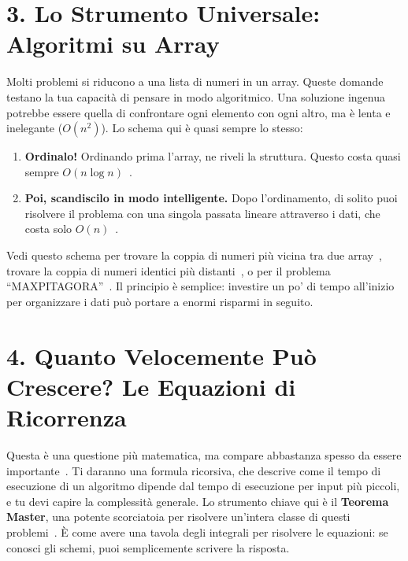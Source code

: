 \documentclass[a4paper, 11pt]{article}
\begin{document}
\section*{3. Lo Strumento Universale: Algoritmi su Array}

Molti problemi si riducono a una lista di numeri in un array. Queste domande testano la tua capacità di pensare in modo algoritmico. Una soluzione ingenua potrebbe essere quella di confrontare ogni elemento con ogni altro, ma è lenta e inelegante ($O(n^2)$). Lo schema qui è quasi sempre lo stesso:
\begin{enumerate}
    \item \textbf{Ordinalo!} Ordinando prima l'array, ne riveli la struttura. Questo costa quasi sempre $O(n \log n)$~\cite{esame_07_09_23_sort, esame_04_09_24_sort}.
    
    \item \textbf{Poi, scandiscilo in modo intelligente.} Dopo l'ordinamento, di solito puoi risolvere il problema con una singola passata lineare attraverso i dati, che costa solo $O(n)$~\cite{esame_04_09_24_scan}.
\end{enumerate}
Vedi questo schema per trovare la coppia di numeri più vicina tra due array~\cite{esame_04_09_24_scan}, trovare la coppia di numeri identici più distanti~\cite{esame_07_09_23_pair}, o per il problema ``MAXPITAGORA''~\cite{esame_10_01_23_maxpitagora}. Il principio è semplice: investire un po' di tempo all'inizio per organizzare i dati può portare a enormi risparmi in seguito.

\section*{4. Quanto Velocemente Può Crescere? Le Equazioni di Ricorrenza}

Questa è una questione più matematica, ma compare abbastanza spesso da essere importante~\cite{esame_19_06_23_recurrence, esame_20_06_24_recurrence}. Ti daranno una formula ricorsiva, che descrive come il tempo di esecuzione di un algoritmo dipende dal tempo di esecuzione per input più piccoli, e tu devi capire la complessità generale. Lo strumento chiave qui è il \textbf{Teorema Master}, una potente scorciatoia per risolvere un'intera classe di questi problemi~\cite{esame_19_06_23_master, esame_20_06_24_master}. È come avere una tavola degli integrali per risolvere le equazioni: se conosci gli schemi, puoi semplicemente scrivere la risposta.

\vspace{1cm}
\end{document}

